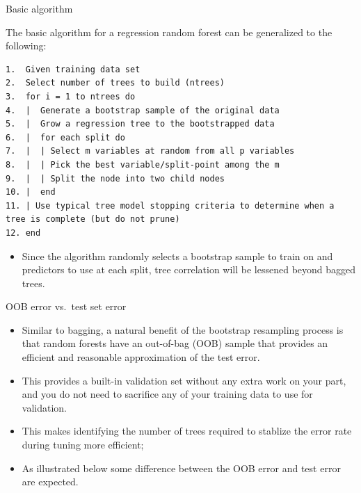 \documentclass[
  10pt,
  ignorenonframetext,
]{beamer}
\providecommand{\tightlist}{%
  \setlength{\itemsep}{0pt}\setlength{\parskip}{0pt}}
\begin{document}
\begin{frame}[fragile]{Basic algorithm}
\protect\hypertarget{basic-algorithm}{}

The basic algorithm for a regression random forest can be generalized to
the following:

\begin{verbatim}
1.  Given training data set
2.  Select number of trees to build (ntrees)
3.  for i = 1 to ntrees do
4.  |  Generate a bootstrap sample of the original data
5.  |  Grow a regression tree to the bootstrapped data
6.  |  for each split do
7.  |  | Select m variables at random from all p variables
8.  |  | Pick the best variable/split-point among the m
9.  |  | Split the node into two child nodes
10. |  end
11. | Use typical tree model stopping criteria to determine when a tree is complete (but do not prune)
12. end
\end{verbatim}

\begin{itemize}
\tightlist
\item
  Since the algorithm randomly selects a bootstrap sample to train on
  and predictors to use at each split, tree correlation will be lessened
  beyond bagged trees.
\end{itemize}

\end{frame}

\begin{frame}{OOB error vs.~test set error}
\protect\hypertarget{oob-error-vs.-test-set-error}{}

\begin{itemize}
\tightlist
\item
  Similar to bagging, a natural benefit of the bootstrap resampling
  process is that random forests have an out-of-bag (OOB) sample that
  provides an efficient and reasonable approximation of the test error.
\item
  This provides a built-in validation set without any extra work on your
  part, and you do not need to sacrifice any of your training data to
  use for validation.
\item
  This makes identifying the number of trees required to stablize the
  error rate during tuning more efficient;
\item
  As illustrated below some difference between the OOB error and test
  error are expected.
\end{itemize}

\end{frame}
\end{document}
